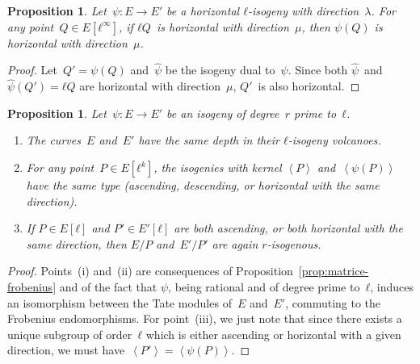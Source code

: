 \documentclass{lms}
\newtheorem{prop}[thm]{Proposition}
\def\chev#1{\left\langle#1\right\rangle}
\begin{document}
\begin{prop}\label{prop:push-horizontal}
Let~$ψ: E → E'$ be a horizontal $ℓ$-isogeny with direction~$λ$.
For any point~$Q ∈ E[ℓ^∞]$,
if $ℓ Q$~is horizontal with direction~$μ$,
then $ψ(Q)$ is horizontal with direction~$μ$.
\end{prop}
\begin{proof}
Let~$Q' = ψ(Q)$ and~$\widehat{ψ}$ be the isogeny dual to~$ψ$.
Since both $\widehat{ψ}$~and~$\widehat{ψ}(Q') = ℓ Q$ are horizontal
with direction~$μ$, $Q'$~is also horizontal.
\end{proof}
\begin{prop}\label{prop:parallel}
Let~$ψ: E → E'$ be an isogeny of degree~$r$ prime to~$ℓ$.
\begin{enumerate}
\item The curves~$E$ and~$E'$ have the same depth
in their $ℓ$-isogeny volcanoes.
\item\label{prop:parallel:func} For any point~$P ∈ E[ℓ^k]$,
the isogenies with kernel $\chev{P}$ and~$\chev{ψ(P)}$ have the same type
(ascending, descending, or horizontal with the same direction).
\item\label{prop:parallel:ascent} If $P ∈ E[ℓ]$ and $P' ∈ E'[ℓ]$ are both ascending,
or both horizontal with the same direction,
then $E/P$ and~$E'/P'$ are again $r$-isogenous.
\end{enumerate}
\end{prop}
\begin{proof}
Points~(i) and~(ii) are consequences of Proposition~\ref{prop:matrice-frobenius}
and of the fact that $ψ$, being rational and of degree prime to~$ℓ$,
induces an isomorphism between the Tate modules of~$E$ and~$E'$,
commuting to the Frobenius endomorphisms.
For point~(iii), we just note that
since there exists a unique subgroup of order~$ℓ$ which is
either ascending or horizontal with a given direction,
we must have~$\chev{P'} = \chev{ψ(P)}$.
\end{proof}

\end{document}
